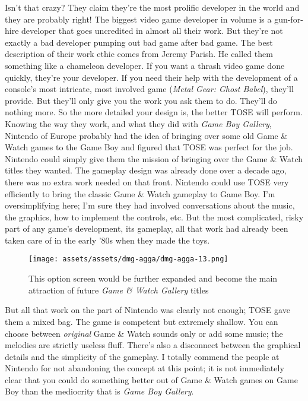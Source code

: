\documentclass{book}
\begin{document}
Isn’t that crazy? They claim they’re the most prolific developer in the world and they are probably right! The biggest video game developer in volume is a gun-for-hire developer that goes uncredited in almost all their work. But they’re not exactly a bad developer pumping out bad game after bad game. The best description of their work ethic comes from Jeremy Parish. He called them something like a chameleon developer. If you want a thrash video game done quickly, they’re your developer. If you need their help with the development of a console’s most intricate, most involved game (\emph{Metal Gear: Ghost Babel}), they’ll provide. But they’ll only give you the work you ask them to do. They’ll do nothing more. So the more detailed your design is, the better TOSE will perform. Knowing the way they work, and what they did with \emph{Game Boy Gallery}, Nintendo of Europe probably had the idea of bringing over some old Game \& Watch games to the Game Boy and figured that TOSE was perfect for the job. Nintendo could simply give them the mission of bringing over the Game \& Watch titles they wanted. The gameplay design was already done over a decade ago, there was no extra work needed on that front. Nintendo could use TOSE very efficiently to bring the classic Game \& Watch gameplay to Game Boy. I’m oversimplifying here; I’m sure they had involved conversations about the music, the graphics, how to implement the controls, etc. But the most complicated, risky part of any game’s development, its gameplay, all that work had already been taken care of in the early ’80s when they made the toys.

\begin{figure}[hbt]
\vskip 10pt
\centering \texttt{[image: assets/assets/dmg-agga/dmg-agga-13.png]}\par\pagetwodescription This option screen would be further expanded and become the main attraction of future \emph{Game \& Watch Gallery} titles
\vskip 6pt
\end{figure}

But all that work on the part of Nintendo was clearly not enough; TOSE gave them a mixed bag. The game is competent but extremely shallow. You can choose between \emph{original} Game \& Watch sounds only or add some music; the melodies are strictly useless fluff. There’s also a disconnect between the graphical details and the simplicity of the gameplay. I totally commend the people at Nintendo for not abandoning the concept at this point; it is not immediately clear that you could do something better out of Game \& Watch games on Game Boy than the mediocrity that is \emph{Game Boy Gallery}.
\end{document}
